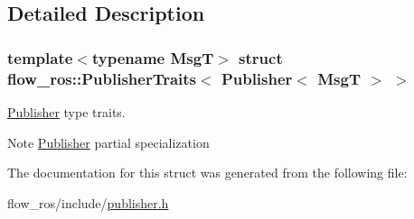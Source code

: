 \subsection{Detailed Description}
\subsubsection*{template$<$typename MsgT$>$\newline
struct flow\+\_\+ros\+::\+Publisher\+Traits$<$ Publisher$<$ Msg\+T $>$ $>$}

\hyperlink{classflow__ros_1_1_publisher}{Publisher} type traits. 

\begin{DoxyNote}{Note}
\hyperlink{classflow__ros_1_1_publisher}{Publisher} partial specialization 
\end{DoxyNote}


The documentation for this struct was generated from the following file\+:\begin{DoxyCompactItemize}
\item 
flow\+\_\+ros/include/\hyperlink{publisher_8h}{publisher.\+h}\end{DoxyCompactItemize}
